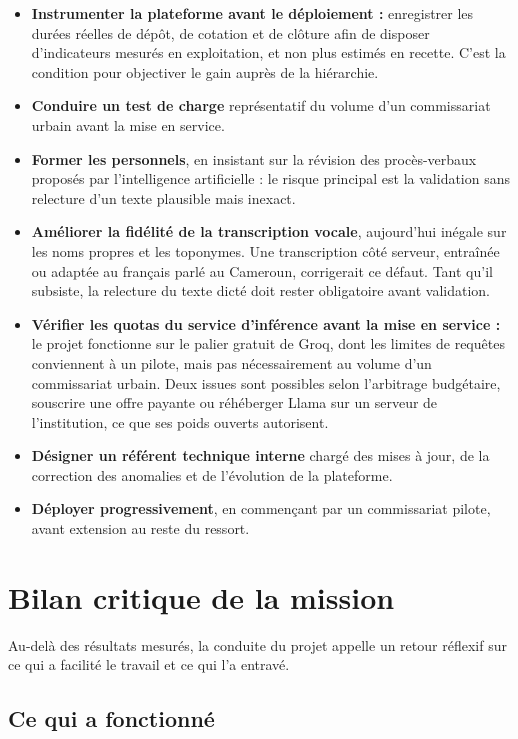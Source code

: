 \begin{itemize}
    \item \textbf{Instrumenter la plateforme avant le déploiement :} enregistrer les durées réelles de dépôt, de cotation et de clôture afin de disposer d'indicateurs mesurés en exploitation, et non plus estimés en recette. C'est la condition pour objectiver le gain auprès de la hiérarchie.
    \item \textbf{Conduire un test de charge} représentatif du volume d'un commissariat urbain avant la mise en service.
    \item \textbf{Former les personnels}, en insistant sur la révision des procès-verbaux proposés par l'intelligence artificielle : le risque principal est la validation sans relecture d'un texte plausible mais inexact.
    \item \textbf{Améliorer la fidélité de la transcription vocale}, aujourd'hui inégale sur les noms propres et les toponymes. Une transcription côté serveur, entraînée ou adaptée au français parlé au Cameroun, corrigerait ce défaut. Tant qu'il subsiste, la relecture du texte dicté doit rester obligatoire avant validation.
    \item \textbf{Vérifier les quotas du service d'inférence avant la mise en service :} le projet fonctionne sur le palier gratuit de Groq, dont les limites de requêtes conviennent à un pilote, mais pas nécessairement au volume d'un commissariat urbain. Deux issues sont possibles selon l'arbitrage budgétaire, souscrire une offre payante ou réhéberger Llama sur un serveur de l'institution, ce que ses poids ouverts autorisent.
    \item \textbf{Désigner un référent technique interne} chargé des mises à jour, de la correction des anomalies et de l'évolution de la plateforme.
    \item \textbf{Déployer progressivement}, en commençant par un commissariat pilote, avant extension au reste du ressort.
\end{itemize}

\section{Bilan critique de la mission}

Au-delà des résultats mesurés, la conduite du projet appelle un retour réflexif sur ce qui a facilité le travail et ce qui l'a entravé.

\subsection{Ce qui a fonctionné}

